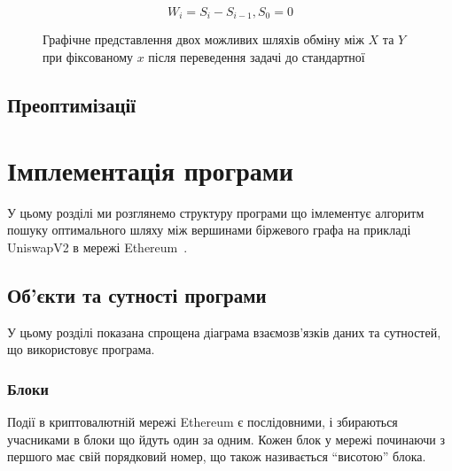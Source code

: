 \documentclass[14pt]{extarticle}
\begin{document}
\begin{equation*}
W_{i} = S_{i} - S_{i-1}, S_{0} = 0
\end{equation*}

\begin{figure}[h]
	\centering
	\caption{\label{fig:eval-func-graph-weight} Графічне представлення двох
	  можливих шляхів обміну між $X$ та $Y$ при фіксованому $x$ після
	  переведення задачі до стандартної}
\end{figure}

\subsection{Преоптимізації}

\newpage

\section{Імплементація програми}

У цьому розділі ми розглянемо структуру програми що імлементує алгоритм пошуку
оптимального шляху між вершинами біржевого графа на прикладі UniswapV2 в мережі
Ethereum~\cite{ethereum}.

\subsection{Об'єкти та сутності програми}

У цьому розділі показана спрощена діаграма взаємозв'язків даних та сутностей, що
використовує програма.

\subsubsection{Блоки}

Події в криптовалютній мережі Ethereum є послідовними, і збираються учасниками в
блоки що йдуть один за одним. Кожен блок у мережі починаючи з першого має свій
порядковий номер, що також називається ``висотою'' блока.
\end{document}
